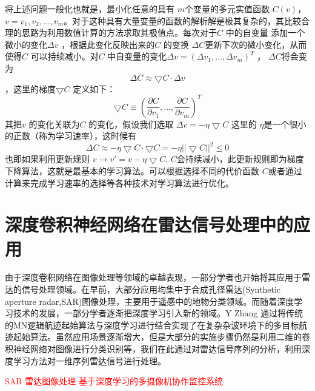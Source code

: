 将上述问题一般化也就是，最小化任意的具有 $m $个变量的多元实值函数 $C(v) $， $v=v_1,v_2,\dots,v_m $。对于这种具有大量变量的函数的解析解是极其复杂的，其比较合理的思路为利用数值计算的方法求取其极值点。每次对于$C $ 中的自变量 添加一个微小的变化$\Delta v $ ，根据此变化反映出来的$C $ 的变换 $\Delta C $更新下次的微小变化，从而使得$C $ 可以持续减小。对$C $ 中自变量的变化$\Delta v=(\Delta v_1,\dots,\Delta v_m)^T $ ， $\Delta C $将会变为
\begin{equation}
    \Delta C \approx \bigtriangledown C \cdot \Delta v   
\end{equation}
，这里的梯度$\bigtriangledown C $ 定义如下：
\begin{equation}
\bigtriangledown C \equiv (\frac{\partial C}{\partial v_1},\dots,\frac{\partial C}{\partial v_m})^T 
\end{equation}
其把$v $ 的变化关联为$C$ 的变化，假设我们选取
$\Delta v=-\eta \bigtriangledown C $
这里的 $\eta $是一个很小的正数（称为学习速率），这时候有
\begin{equation}
\Delta C \approx -\eta\bigtriangledown C\cdot\bigtriangledown C=-\eta||\bigtriangledown C||^2 \leq 0  
\end{equation}
也即如果利用更新规则
$v \rightarrow v'=v-\eta \bigtriangledown C$,
$C $会持续减小，此更新规则即为梯度下降算法，这就是最基本的学习算法。可以根据选择不同的代价函数 $C $或者通过计算来完成学习速率的选择等各种技术对学习算法进行优化。

\section{深度卷积神经网络在雷达信号处理中的应用}
由于深度卷积网络在图像处理等领域的卓越表现，一部分学者也开始将其应用于雷达的信号处理领域。在早前，大部分应用均集中于合成孔径雷达(Synthetic aperture radar,SAR)图像处理，主要用于遥感中的地物分类领域\cite{chen2014sar,xie2014multilayer,lv2014classification}。而随着深度学习技术的发展，一部分学者逐渐把深度学习引入新的领域。Y Zhang \cite{zhang2017novel}通过将传统的MN逻辑航迹起始算法与深度学习进行结合实现了在复杂杂波环境下的多目标航迹起始算法。虽然应用场景逐渐增大，但是大部分的实施步骤仍然是利用二维的卷积神经网络对图像进行分类识别等，我们在此通过对雷达信号序列的分析，利用深度学习方法对一维序列雷达信号进行处理。

\textcolor{red}{SAR 雷达图像处理 基于深度学习的多摄像机协作监控系统}

